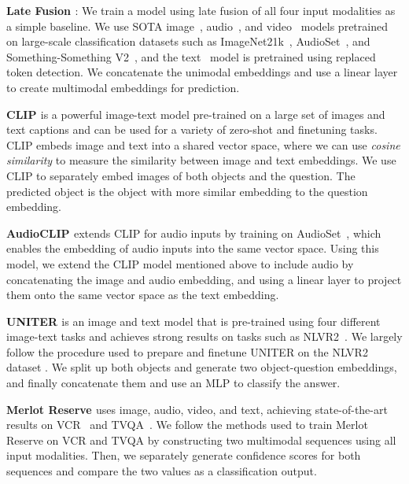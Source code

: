 \documentclass[runningheads]{llncs}
\begin{document}
\textbf{Late Fusion \cite{pandeya2021fusion}}: We train a model using late fusion of all four input modalities as a simple baseline. We use SOTA image~\cite{dosovitskiy2020vit}, audio~\cite{gong2021ast}, and video~\cite{wang2021tdn} models pretrained on large-scale classification datasets such as ImageNet21k~\cite{ridnik2021imagenet21k}, AudioSet~\cite{gemmeke2017audioset}, and Something-Something V2~\cite{goyal2017something}, and the text~\cite{he2021debertav3} model is pretrained using replaced token detection. We concatenate the unimodal embeddings and use a linear layer to create multimodal embeddings for prediction. 

\noindent \textbf{CLIP \cite{radford2021clip}} is a powerful image-text model pre-trained on a large set of images and text captions and can be used for a variety of zero-shot and finetuning tasks. CLIP embeds image and text into a shared vector space, where we can use \textit{cosine similarity} to measure the similarity between image and text embeddings.
We use CLIP to separately embed images of both objects and the question. The predicted object is the object with more similar embedding to the question embedding.

\noindent \textbf{AudioCLIP \cite{guzhov2021audioclip}} extends CLIP for audio inputs by training on AudioSet~\cite{gemmeke2017audioset}, which enables the embedding of audio inputs into the same vector space. Using this model, we extend the CLIP model mentioned above to include audio by concatenating the image and audio embedding, and using a linear layer to project them onto the same vector space as the text embedding. 


\noindent \textbf{UNITER \cite{chen2020uniter}} is an image and text model that is pre-trained using four different image-text tasks and achieves strong results on tasks such as NLVR2~\cite{suhr2019nlvr2}. We largely follow the procedure used to prepare and finetune UNITER on the NLVR2 dataset \cite{suhr2019nlvr2}. We split up both objects and generate two object-question embeddings, and finally concatenate them and use an MLP to classify the answer.


\noindent \textbf{Merlot Reserve \cite{zellers2022merlotreserve}} uses image, audio, video, and text, achieving state-of-the-art results on VCR~\cite{zellers2019vcr} and TVQA~\cite{lei2018tvqa}. We follow the methods used to train Merlot Reserve on VCR and TVQA by constructing two multimodal sequences using all input modalities. Then, we separately generate confidence scores for both sequences and compare the two values as a classification output. 
\end{document}
